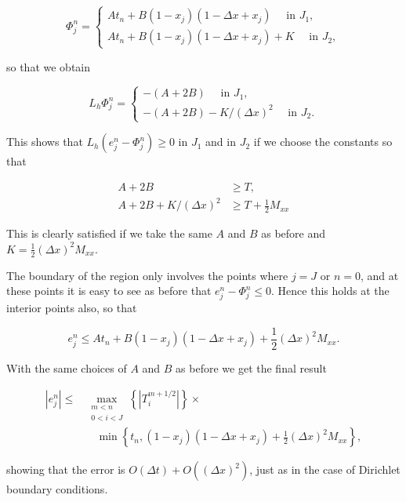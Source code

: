 \documentclass[10pt]{article}
\begin{document}
\[
\Phi_{j}^{n}=\left\{\begin{array}{l}
A t_{n}+B\left(1-x_{j}\right)\left(1-\Delta x+x_{j}\right) \quad \text { in } J_{1}, \\
A t_{n}+B\left(1-x_{j}\right)\left(1-\Delta x+x_{j}\right)+K \quad \text { in } J_{2},
\end{array}\right.
\]

so that we obtain

\[
L_{h} \Phi_{j}^{n}=\left\{\begin{array}{l}
-(A+2 B) \quad \text { in } J_{1}, \\
-(A+2 B)-K /(\Delta x)^{2} \quad \text { in } J_{2} .
\end{array}\right.
\]

This shows that \(L_{h}\left(e_{j}^{n}-\Phi_{j}^{n}\right) \geq 0\) in \(J_{1}\) and in \(J_{2}\) if we choose the constants so that

\[
\begin{aligned}
A+2 B & \geq T, \\
A+2 B+K /(\Delta x)^{2} & \geq T+\frac{1}{2} M_{x x}
\end{aligned}
\]

This is clearly satisfied if we take the same \(A\) and \(B\) as before and \(K=\frac{1}{2}(\Delta x)^{2} M_{x x}\).

The boundary of the region only involves the points where \(j=J\) or \(n=0\), and at these points it is easy to see as before that \(e_{j}^{n}-\Phi_{j}^{n} \leq 0\). Hence this holds at the interior points also, so that

\[
e_{j}^{n} \leq A t_{n}+B\left(1-x_{j}\right)\left(1-\Delta x+x_{j}\right)+\frac{1}{2}(\Delta x)^{2} M_{x x} .
\]

With the same choices of \(A\) and \(B\) as before we get the final result

\[
\begin{aligned}
\left|e_{j}^{n}\right| \leq & \max _{\substack{m<n \\
0<i<J}}\left\{\left|T_{i}^{m+1 / 2}\right|\right\} \times \\
& \quad \min \left\{t_{n},\left(1-x_{j}\right)\left(1-\Delta x+x_{j}\right)+\frac{1}{2}(\Delta x)^{2} M_{x x}\right\},
\end{aligned}
\]

showing that the error is \(O(\Delta t)+O\left((\Delta x)^{2}\right)\), just as in the case of Dirichlet boundary conditions.
\end{document}
